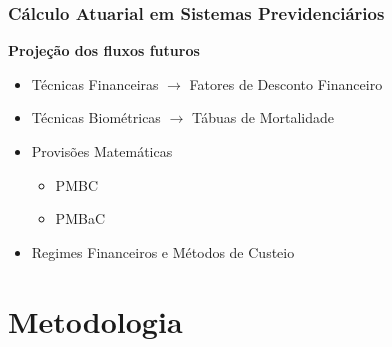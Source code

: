 \documentclass[11pt]{beamer}
\begin{document}
    \begin{frame}

        \frametitle{Cálculo Atuarial em Sistemas Previdenciários}

            \textbf{Projeção dos fluxos futuros}
                \medskip

                \begin{itemize}
                    \item Técnicas Financeiras $\to$ Fatores de Desconto Financeiro
                    \medskip
                    \item Técnicas Biométricas $\to$ Tábuas de Mortalidade
                    \bigskip
                    \item Provisões Matemáticas
                        \medskip
                        \begin{itemize}
                            \item[$-$] PMBC
                            \medskip
                            \item[$-$] PMBaC
                        \end{itemize}
                    \item Regimes Financeiros e Métodos de Custeio
                \end{itemize}


    \end{frame}

\section{Metodologia}
\end{document}
